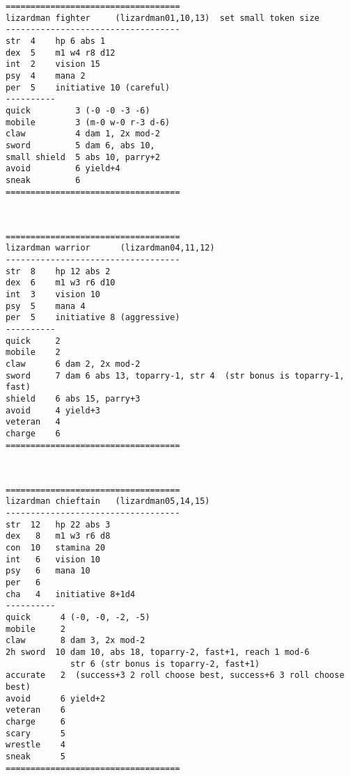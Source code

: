 \goodbreak \begin{samepage} \small \begin{verbatim}
===================================
lizardman fighter     (lizardman01,10,13)  set small token size
-----------------------------------
str  4    hp 6 abs 1
dex  5    m1 w4 r8 d12
int  2    vision 15
psy  4    mana 2
per  5    initiative 10 (careful)
----------
quick         3 (-0 -0 -3 -6)
mobile        3 (m-0 w-0 r-3 d-6)
claw          4 dam 1, 2x mod-2
sword         5 dam 6, abs 10,
small shield  5 abs 10, parry+2
avoid         6 yield+4
sneak         6
===================================
\end{verbatim} \normalsize \end{samepage}

\

\goodbreak \begin{samepage} \small \begin{verbatim}
===================================
lizardman warrior      (lizardman04,11,12)
-----------------------------------
str  8    hp 12 abs 2
dex  6    m1 w3 r6 d10
int  3    vision 10
psy  5    mana 4
per  5    initiative 8 (aggressive)
----------
quick     2
mobile    2
claw      6 dam 2, 2x mod-2
sword     7 dam 6 abs 13, toparry-1, str 4  (str bonus is toparry-1, fast)
shield    6 abs 15, parry+3
avoid     4 yield+3
veteran   4
charge    6
===================================
\end{verbatim} \normalsize \end{samepage}

\

\goodbreak \begin{samepage} \small \begin{verbatim}
===================================
lizardman chieftain   (lizardman05,14,15)
-----------------------------------
str  12   hp 22 abs 3
dex   8   m1 w3 r6 d8
con  10   stamina 20
int   6   vision 10
psy   6   mana 10
per   6
cha   4   initiative 8+1d4
----------
quick      4 (-0, -0, -2, -5)
mobile     2
claw       8 dam 3, 2x mod-2
2h sword  10 dam 10, abs 18, toparry-2, fast+1, reach 1 mod-6
             str 6 (str bonus is toparry-2, fast+1)
accurate   2  (success+3 2 roll choose best, success+6 3 roll choose best)
avoid      6 yield+2
veteran    6
charge     6
scary      5
wrestle    4
sneak      5
===================================
\end{verbatim} \normalsize \end{samepage}

\

